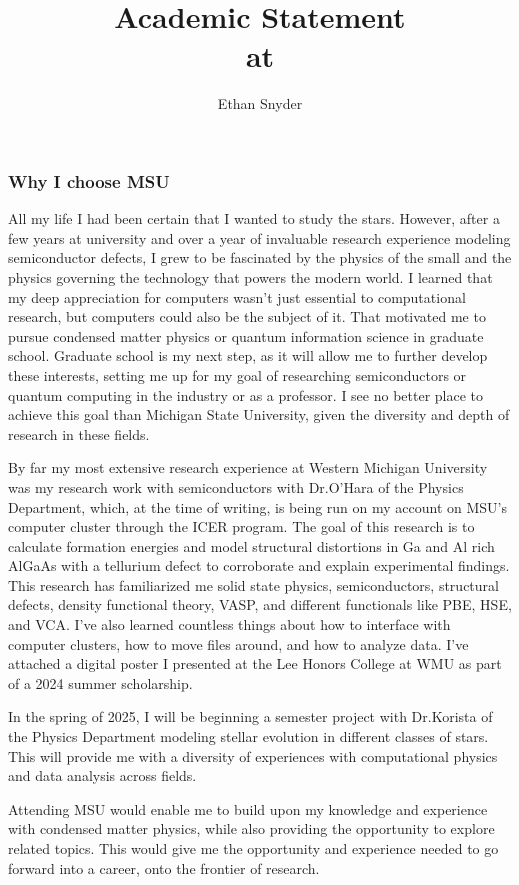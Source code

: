 \documentclass[11pt]{article}
\title{Academic Statement\\
	\large \dept{} at \school{}}
\author{Ethan Snyder}
\newcommand{\school}{Michigan State University}
\newcommand{\schoolabbr}{MSU}
\begin{document}
\maketitle
\subsubsection*{Why I choose \schoolabbr}
All my life I had been certain that I wanted to study the stars. However, after a few years at university and over a year of invaluable research experience modeling semiconductor defects, I grew to be fascinated by the physics of the small and the physics governing the technology that powers the modern world. I learned that my deep appreciation for computers wasn't just essential to computational research, but computers could also be the subject of it. That motivated me to pursue condensed matter physics or quantum information science in graduate school. Graduate school is my next step, as it will allow me to further develop these interests, setting me up for my goal of researching semiconductors or quantum computing in the industry or as a professor. I see no better place to achieve this goal than \school{}, given the diversity and depth of research in these fields.

By far my most extensive research experience at Western Michigan University was my research work with semiconductors with Dr.\@ O'Hara of the Physics Department, which, at the time of writing, is being run on my account on MSU's computer cluster through the ICER program. The goal of this research is to calculate formation energies and model structural distortions in Ga and Al rich AlGaAs with a tellurium defect to corroborate and explain experimental findings. This research has familiarized me solid state physics, semiconductors, structural defects, density functional theory, VASP, and different functionals like PBE, HSE, and VCA. I've also learned countless things about how to interface with computer clusters, how to move files around, and how to analyze data. I've attached a digital poster I presented at the Lee Honors College at WMU as part of a 2024 summer scholarship.

In the spring of 2025, I will be beginning a semester project with Dr.\@ Korista of the Physics Department modeling stellar evolution in different classes of stars. This will provide me with a diversity of experiences with computational physics and data analysis across fields.

Attending MSU would enable me to build upon my knowledge and experience with condensed matter physics, while also providing the opportunity to explore related topics. This would give me the opportunity and experience needed to go forward into a career, onto the frontier of research.
\end{document}

